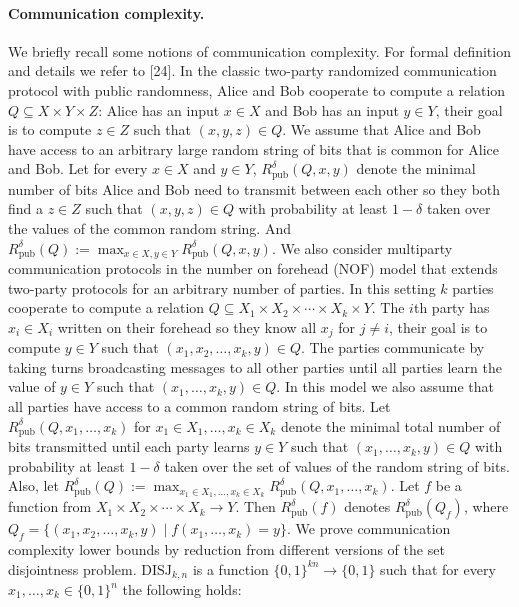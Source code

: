 \paragraph{Communication complexity.} We briefly recall some notions of communication complexity. For formal definition and details we refer to [24].
In the classic two-party randomized communication protocol with public randomness, Alice and Bob cooperate to compute a relation $Q\subseteq X\times Y\times Z$: Alice has an input $x\in X$ and Bob has an input $y\in Y$, their goal is to compute $z\in Z$ such that $(x,y,z)\in Q$. We assume that Alice and Bob have access to an arbitrary large random string of bits that is common for Alice and Bob. Let for every $x\in X$ and $y\in Y$, $R^\delta_{\mathrm{pub}}(Q,x,y)$ denote the minimal number of bits Alice and Bob need to transmit between each other so they both find a $z\in Z$ such that $(x,y,z)\in Q$ with probability at least $1-\delta$ taken over the values of the common random string. And $R^\delta_{\mathrm{pub}}(Q):=\max_{x\in X,y\in Y}R^\delta_{\mathrm{pub}}(Q,x,y)$.
We also consider multiparty communication protocols in the number on forehead (NOF) model that extends two-party protocols for an arbitrary number of parties. In this setting $k$ parties cooperate to compute a relation $Q\subseteq X_1\times X_2\times\cdots\times X_k\times Y$. The $i$th party has $x_i\in X_i$ written on their forehead so they know all $x_j$ for $j\ne i$, their goal is to compute $y\in Y$ such that $(x_1,x_2,\ldots,x_k,y)\in Q$. The parties communicate by taking turns broadcasting messages to all other parties until all parties learn the value of $y\in Y$ such that $(x_1,\ldots,x_k,y)\in Q$. In this model we also assume that all parties have access to a common random string of bits. Let $R^\delta_{\mathrm{pub}}(Q,x_1,\ldots,x_k)$ for $x_1\in X_1,\ldots,x_k\in X_k$ denote the minimal total number of bits transmitted until each party learns $y\in Y$ such that $(x_1,\ldots,x_k,y)\in Q$ with probability at least $1-\delta$ taken over the set of values of the random string of bits. Also, let $R^\delta_{\mathrm{pub}}(Q):=\max_{x_1\in X_1,\ldots,x_k\in X_k}R^\delta_{\mathrm{pub}}(Q,x_1,\ldots,x_k)$.
Let $f$ be a function from $X_1\times X_2\times\cdots\times X_k\to Y$. Then $R^\delta_{\mathrm{pub}}(f)$ denotes $R^\delta_{\mathrm{pub}}(Q_f)$, where $Q_f=\{(x_1,x_2,\ldots,x_k,y)\mid f(x_1,\ldots,x_k)=y\}$.
We prove communication complexity lower bounds by reduction from different versions of the set disjointness problem. $\mathrm{DISJ}_{k,n}$ is a function $\{0,1\}^{kn}\to\{0,1\}$ such that for every $x_1,\ldots,x_k\in\{0,1\}^n$ the following holds:

